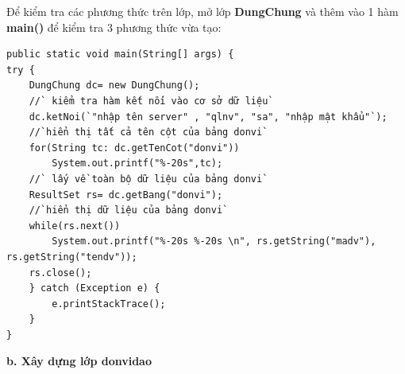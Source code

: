Để kiểm tra các  phương thức trên lớp, mở lớp \textbf{DungChung} và thêm vào 1 hàm \textbf{main()} để kiểm tra 3 phương thức vừa tạo:
\begin{lstlisting}[escapechar=`]
public static void main(String[] args) {
try {
	DungChung dc= new DungChung();
	//` kiểm tra hàm kết nối vào cơ sở dữ liệu`
	dc.ketNoi(`"nhập tên server" , "qlnv", "sa", "nhập mật khẩu"`);
	//`hiển thị tất cả tên cột của bảng donvi`
	for(String tc: dc.getTenCot("donvi"))
		System.out.printf("%-20s",tc);
	//` lấy về toàn bộ dữ liệu của bảng donvi`
	ResultSet rs= dc.getBang("donvi");
	//`hiển thị dữ liệu của bảng donvi`
	while(rs.next())
		System.out.printf("%-20s %-20s \n", rs.getString("madv"), rs.getString("tendv"));
	rs.close();
	} catch (Exception e) {
		e.printStackTrace();
	}
}
\end{lstlisting}
\textbf{ b. Xây dựng lớp donvidao}

